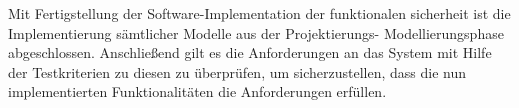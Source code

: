 \documentclass[../../../Bachelorarbeit.tex]{subfiles}
\begin{document}
Mit Fertigstellung der Software-Implementation der funktionalen sicherheit ist die Implementierung sämtlicher Modelle aus der Projektierungs- \bzw Modellierungsphase abgeschlossen. Anschließend gilt es die Anforderungen an das System mit Hilfe der Testkriterien zu diesen zu überprüfen, um sicherzustellen, dass die nun implementierten Funktionalitäten die Anforderungen erfüllen.
\end{document}
